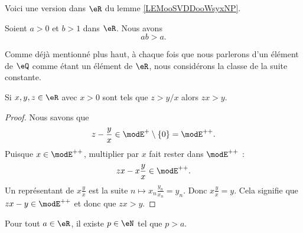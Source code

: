 Voici une version dans \( \eR\) du lemme \ref{LEMooSVDDooWsyxNP}.
\begin{lemma}       \label{LEMooKAXFooIPyzJC}
	Soient \( a>0\) et \( b>1\) dans \( \eR\). Nous avons
	\begin{equation}
		ab>a.
	\end{equation}
\end{lemma}

\begin{remark}
	Comme déjà mentionné plus haut, à chaque fois que nous parlerons d'un élément de \( \eQ\) comme étant un élément de \( \eR\), nous considérons la classe de la suite constante.
\end{remark}

\begin{lemma}       \label{LemooYNOVooOwoRwD}
	Si \( x,y,z\in \eR\) avec \( x>0\) sont tels que \( z>y/x\) alors \( zx>y\).
\end{lemma}

\begin{proof}
	Nous savons que
	\begin{equation}
		z-\frac{ y }{ x }\in \modE^+\setminus\{ 0 \}=\modE^{++}.
	\end{equation}
	Puisque \( x\in\modE^{++}\), multiplier par \( x\) fait rester dans \( \modE^{++}\) :
	\begin{equation}
		zx-x\frac{ y }{ x }\in \modE^{++}.
	\end{equation}
	Un représentant de \( x\frac{ y }{ x }\) est la suite \( n\mapsto x_n\frac{ y_n }{ x_n }=y_n\). Donc \( x\frac{ y }{ x }=y\). Cela signifie que \( zx-y\in\modE^{++}\) et donc que \( zx>y\).
\end{proof}

\begin{lemma}       \label{LemooMWOUooVWgaEi}
	Pour tout \( a\in \eR\), il existe \( p\in \eN\) tel que \( p>a\).
\end{lemma}

